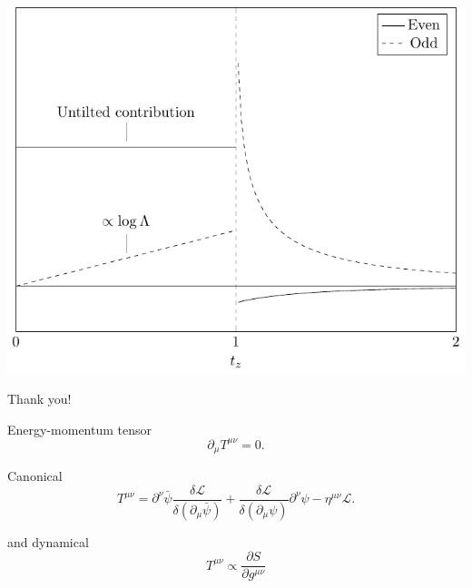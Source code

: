 \documentclass{beamer}
\begin{document}
\begin{frame}
\centering
\includegraphics[width=.8\textwidth]{schematic_tz}
\end{frame}

\begin{frame}[standout]
  \begin{block}{}
    \centering\Huge
    Thank you!
  \end{block}
\end{frame}

\appendix
\begin{frame}{Energy-momentum tensor}
  \begin{equation}
    \label{eq:6}
    \partial_{\mu} T^{\mu \nu} = 0.
  \end{equation}

  Canonical
\begin{equation}
  T^{\mu \nu} = \partial^{\nu} \bar{\psi} \frac{\delta \mathcal{L}}{\delta (\partial_{\mu} \bar{\psi})} + \frac{\delta \mathcal{L}}{\delta (\partial_{\mu} \psi)} \partial^{\nu} \psi - \eta^{\mu \nu} \mathcal{L}.
\end{equation}

  and dynamical
  \begin{equation}
    T^{\mu\nu } \propto \frac{\partial S}{\partial g^{\mu\nu}}
  \end{equation}
\end{frame}
\begin{frame}
\printbibliography
\end{frame}
\end{document}
